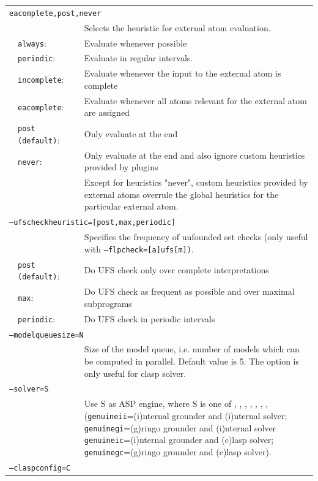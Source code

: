 \documentclass[a4paper, titlepage]{article}
\begin{document}
\begin{center}
\begin{longtable}{p{0.7cm}  p{2.2cm} p{0.3cm} p{6.3cm}  }
\multicolumn{4}{l}{\texttt{eacomplete,post,never}}\\
& & & Selects the heuristic for external atom evaluation.\\
&\texttt{always}:&&Evaluate whenever possible\\
&\texttt{periodic}:&&Evaluate in regular intervals.\\
&\texttt{incomplete}:&&Evaluate whenever the input to the external atom is complete\\
&\texttt{eacomplete}:&& Evaluate whenever all atoms relevant for the external atom are assigned\\
&\texttt{post (default)}:&&Only evaluate at the end\\
&\texttt{never}:&&Only evaluate at the end and also ignore custom heuristics provided by plugins\\
&&&Except for heuristics "never", custom heuristics provided by external atoms overrule the global heuristics for the particular external atom.\\
\multicolumn{4}{l}{\texttt{--ufscheckheuristic=[post,max,periodic]}}\\
& & & Specifies the frequency of unfounded set checks (only useful with \texttt{--flpcheck=[a]ufs[m])}.\\
&\texttt{post (default)}:&&Do UFS check only over complete interpretations\\
&\texttt{max}:&&Do UFS check as frequent as possible and over maximal subprograms\\
&\texttt{periodic}:&&Do UFS check in periodic intervals\\
\multicolumn{4}{l}{\texttt{--modelqueuesize=N}}\\
& & & Size of the model queue, i.e. number of models which can be computed in parallel. Default value is 5. The option is only useful for clasp solver.\\
\multicolumn{4}{l}{\texttt{--solver=S}}\\
& & & Use S as ASP engine, where S is one of \dlv{}, \dlvdb{}, \libdlv{}, \libclingo{}, \genuineii{}, \genuinegi{}, \genuineic{}, \genuinegc{} (\texttt{genuineii}=(i)nternal grounder and (i)nternal solver; \texttt{genuinegi}=(g)ringo grounder and (i)nternal solver \texttt{genuineic}=(i)nternal grounder and (c)lasp solver; \texttt{genuinegc}=(g)ringo grounder and (c)lasp solver).\\
\multicolumn{4}{l}{\texttt{--claspconfig=C}}\\

\end{longtable}
\end{center}
\end{document}
